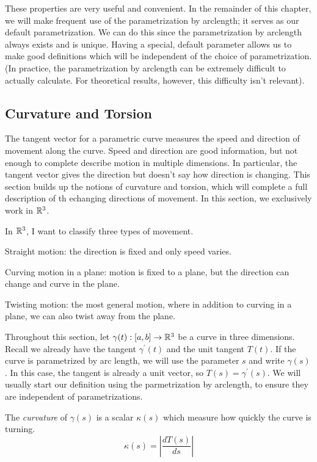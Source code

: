 \documentclass[fleqn,letterpaper]{report}
\begin{document}
These properties are very useful and convenient. In the
remainder of this chapter, we will make frequent use of the
parametrization by arclength; it serves as our default
parametrization. We can do this since the parametrization by
arclength always exists and is unique. Having a special,
default parameter allows us to make good definitions which
will be independent of the choice of parametrization. (In
practice, the parametrization by arclength can be extremely
difficult to actually calculate. For theoretical results,
however, this difficulty isn't relevant).

\subsection{Curvature and Torsion}
\label{curvature-and-torsion}

The tangent vector for a parametric curve measures the speed
and direction of movement along the curve. Speed and direction
are good information, but not enough to complete describe
motion in multiple dimensions. In particular, the tangent
vector gives the direction but doesn't say how direction is
changing. This section builds up the notions of curvature and
torsion, which will complete a full description of th
echanging directions of movement. In this section, we
exclusively work in $\mathbb{R}^3$.

In $\mathbb{R}^3$, I want to classify three types of movement.
\begin{smallitemize}
\item Straight motion: the direction is fixed and only speed
varies.
\item Curving motion in a plane: motion is fixed to a plane,
but the direction can change and curve in the plane.
\item Twisting motion: the most general motion, where in
addition to curving in a plane, we can also twist away from
the plane.
\end{smallitemize}
Throughout this section, let $\gamma(t): [a,b] \rightarrow
\mathbb{R}^3$ be a curve in three dimensions. Recall we already have
the tangent $\gamma^\prime(t)$ and the unit tangent $T(t)$.
If the curve is parametrized by arc length, we will use the
parameter $s$ and write $\gamma(s)$. In this case, the tangent
is already a unit vector, so $T(s) = \gamma^\prime(s)$. We
will usually start our definition using the parmetrization by
arclength, to ensure they are independent of
parametrizations.

\begin{defn}
The \emph{curvature} of $\gamma(s)$ is a scalar $\kappa(s)$
which measure how quickly the curve is turning. 
\begin{equation*}
\kappa(s) = \left| \frac{dT(s)}{ds} \right|
\end{equation*}
\end{defn}
\end{document}
